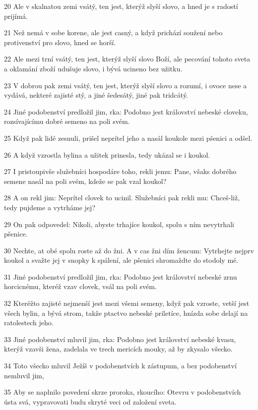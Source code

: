 \par 20 Ale v skalnatou zemi vsátý, ten jest, kterýž slyší slovo, a hned je s radostí prijímá.
\par 21 Než nemá v sobe korene, ale jest casný, a když prichází soužení nebo protivenství pro slovo, hned se horší.
\par 22 Ale mezi trní vsátý, ten jest, kterýž slyší slovo Boží, ale pecování tohoto sveta a oklamání zboží udušuje slovo, i bývá ucineno bez užitku.
\par 23 V dobrou pak zemi vsátý, ten jest, kterýž slyší slovo a rozumí, i ovoce nese a vydává, nekteré zajisté stý, a jiné šedesátý, jiné pak tridcátý.
\par 24 Jiné podobenství predložil jim, rka: Podobno jest království nebeské cloveku, rozsívajícímu dobré semeno na poli svém.
\par 25 Když pak lidé zesnuli, prišel neprítel jeho a nasál koukole mezi pšenici a odšel.
\par 26 A když vzrostla bylina a užitek prinesla, tedy ukázal se i koukol.
\par 27 I pristoupivše služebníci hospodáre toho, rekli jemu: Pane, všaks dobrého semene nasál na poli svém, kdeže se pak vzal koukol?
\par 28 A on rekl jim: Neprítel clovek to ucinil. Služebníci pak rekli mu: Chceš-liž, tedy pujdeme a vytrháme jej?
\par 29 On pak odpovedel: Nikoli, abyste trhajíce koukol, spolu s ním nevytrhali pšenice.
\par 30 Nechte, at obé spolu roste až do žni. A v cas žni dím žencum: Vytrhejte nejprv koukol a svažte jej v snopky k spálení, ale pšenici shromaždte do stodoly mé.
\par 31 Jiné podobenství predložil jim, rka: Podobno jest království nebeské zrnu horcicnému, kteréž vzav clovek, vsál na poli svém.
\par 32 Kteréžto zajisté nejmenší jest mezi všemi semeny, když pak vzroste, vetší jest všech bylin, a bývá strom, takže ptactvo nebeské priletíce, hnízda sobe delají na ratolestech jeho.
\par 33 Jiné podobenství mluvil jim, rka: Podobno jest království nebeské kvasu, kterýž vzavši žena, zadelala ve trech mericích mouky, až by zkysalo všecko.
\par 34 Toto všecko mluvil Ježíš v podobenstvích k zástupum, a bez podobenství nemluvil jim,
\par 35 Aby se naplnilo povedení skrze proroka, rkoucího: Otevru v podobenstvích ústa svá, vypravovati budu skryté veci od založení sveta.
